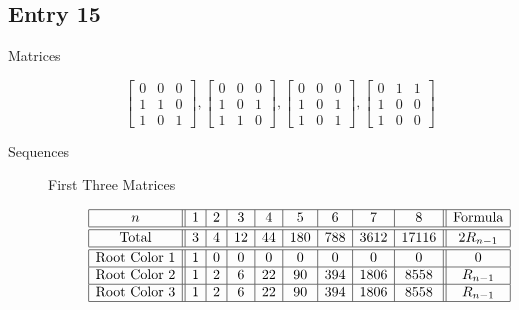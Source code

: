 \documentclass[12pt]{amsart}
\begin{document}
\subsection*{Entry 15}
\begin{description}
    \item[Matrices]
    \[\begin{bmatrix}
    0 & 0 & 0 \\
    1 & 1 & 0 \\
    1 & 0 & 1
    \end{bmatrix}, \begin{bmatrix}
    0 & 0 & 0 \\
    1 & 0 & 1 \\
    1 & 1 & 0
    \end{bmatrix}, \begin{bmatrix}
    0 & 0 & 0 \\
    1 & 0 & 1 \\
    1 & 0 & 1
    \end{bmatrix}, \begin{bmatrix}
    0 & 1 & 1 \\
    1 & 0 & 0 \\
    1 & 0 & 0
    \end{bmatrix}\]
    \item[Sequences]\hspace*{\fill}
    \begin{description}
        \item[First Three Matrices]\hspace*{\fill}\vspace{-0.5cm}
        \begin{center}
            \[
            \begin{array}{|c||c|c|c|c|c|c|c|c||c|}\hline
               n  & 1 & 2 & 3 & 4 & 5 & 6 & 7 & 8  & \text{Formula}\\\hline\hline
               \text{Total}  & 3 & 4 & 12 & 44 & 180 & 788 & 3612 & 17116 & 2R_{n-1}\\\hline\hline
               \text{Root Color }1 & 1 & 0 & 0 & 0 & 0 & 0 & 0 & 0 & 0\\\hline
               \text{Root Color }2 & 1 & 2 & 6 & 22 & 90 & 394 & 1806 & 8558 & R_{n-1}\\\hline
               \text{Root Color }3 & 1 & 2 & 6 & 22 & 90 & 394 & 1806 & 8558 & R_{n-1}\\\hline
            \end{array}
            \]
        \end{center}

\end{description}
\end{description}
\end{document}
